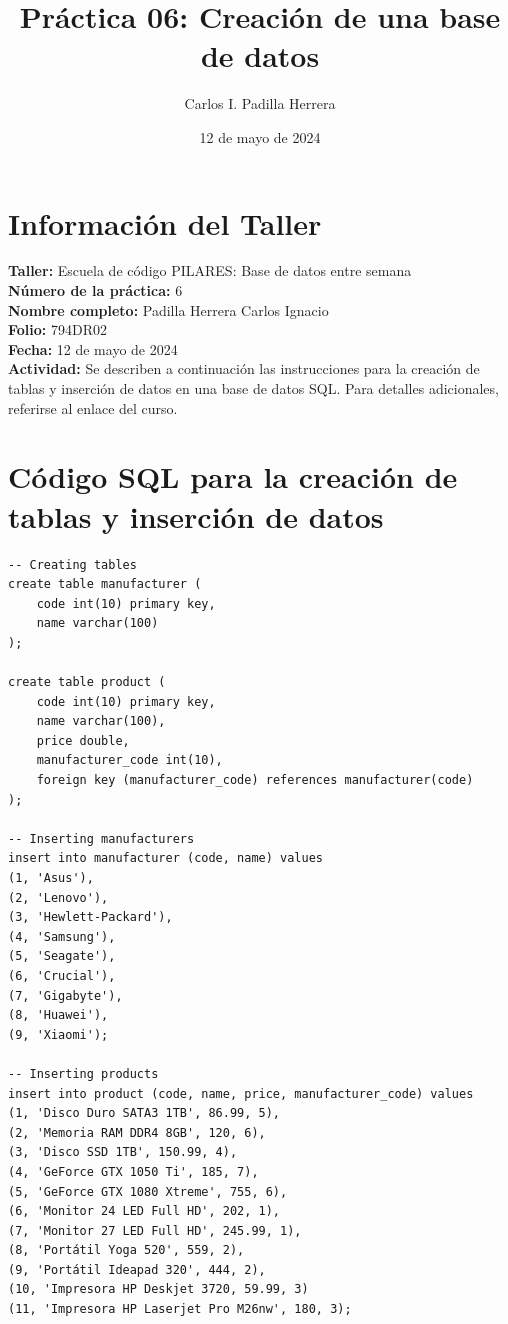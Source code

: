 \documentclass{article}
\title{Práctica 06: Creación de una base de datos}
\author{Carlos I. Padilla Herrera}
\date{12 de mayo de 2024}
\begin{document}
\maketitle

\section*{Información del Taller}
\textbf{Taller:} Escuela de código PILARES: Base de datos entre semana \\
\textbf{Número de la práctica:} 6 \\
\textbf{Nombre completo:} Padilla Herrera Carlos Ignacio \\
\textbf{Folio:} 794DR02 \\
\textbf{Fecha:} 12 de mayo de 2024 \\
\textbf{Actividad:} Se describen a continuación las instrucciones para la creación de tablas y inserción de datos en una base de datos SQL. Para detalles adicionales, referirse al enlace del curso.

\newpage

\section*{Código SQL para la creación de tablas y inserción de datos}

\begin{lstlisting}
-- Creating tables
create table manufacturer (
    code int(10) primary key,
    name varchar(100)
);

create table product (
    code int(10) primary key,
    name varchar(100),
    price double,
    manufacturer_code int(10),
    foreign key (manufacturer_code) references manufacturer(code)
);

-- Inserting manufacturers
insert into manufacturer (code, name) values
(1, 'Asus'),
(2, 'Lenovo'),
(3, 'Hewlett-Packard'),
(4, 'Samsung'),
(5, 'Seagate'),
(6, 'Crucial'),
(7, 'Gigabyte'),
(8, 'Huawei'),
(9, 'Xiaomi');

-- Inserting products
insert into product (code, name, price, manufacturer_code) values
(1, 'Disco Duro SATA3 1TB', 86.99, 5),
(2, 'Memoria RAM DDR4 8GB', 120, 6),
(3, 'Disco SSD 1TB', 150.99, 4),
(4, 'GeForce GTX 1050 Ti', 185, 7),
(5, 'GeForce GTX 1080 Xtreme', 755, 6),
(6, 'Monitor 24 LED Full HD', 202, 1),
(7, 'Monitor 27 LED Full HD', 245.99, 1),
(8, 'Portátil Yoga 520', 559, 2),
(9, 'Portátil Ideapad 320', 444, 2),
(10, 'Impresora HP Deskjet 3720, 59.99, 3)
(11, 'Impresora HP Laserjet Pro M26nw', 180, 3);
\end{lstlisting}
\end{document}

